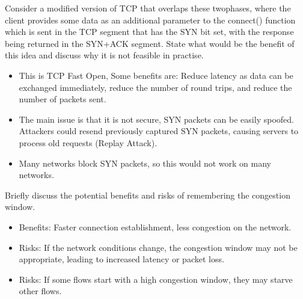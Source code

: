 \documentclass{article}
\begin{document}
\noindent Consider a modified version of TCP that overlaps these twophases, where the client provides some data as an additional parameter to the connect()
function which is sent in the TCP segment that has the SYN bit set, with the response being
returned in the SYN+ACK segment. State what would be the benefit of this idea and discuss
why it is not feasible in practise.
\begin{itemize}
    \item This is TCP Fast Open, Some benefits are: Reduce latency as data can be exchanged immediately, reduce the number of round trips, and reduce the number of packets sent.
    \item The main issue is that it is not secure, SYN packets can be easily spoofed. Attackers could resend previously captured SYN packets, causing servers to process old requests (Replay Attack).
    \item Many networks block SYN packets, so this would not work on many networks.
\end{itemize}

Briefly discuss the potential benefits and risks of remembering the congestion window.
\begin{itemize}
    \item Benefits: Faster connection establishment, less congestion on the network.
    \item Risks: If the network conditions change, the congestion window may not be appropriate, leading to increased latency or packet loss. 
    \item Risks: If some flows start with a high congestion window, they may starve other flows.
\end{itemize}
\end{document}

